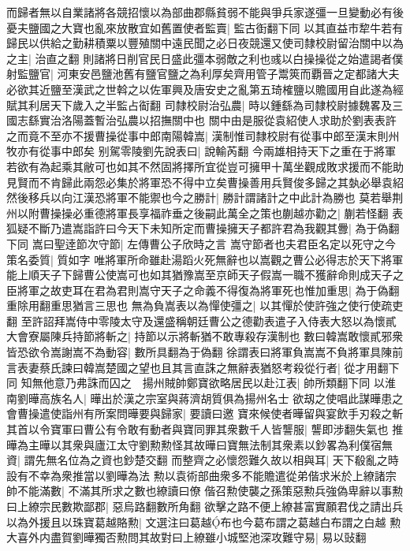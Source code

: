 而歸者無以自業諸將各競招懷以為部曲郡縣貧弱不能與爭兵家遂彊一旦變動必有後憂夫鹽國之大寶也亂來放散宜如舊置使者監賣|{
	監古衘翻下同}
以其直益市犂牛若有歸民以供給之勤耕積粟以豐殖關中遠民聞之必日夜競還又使司隸校尉留治關中以為之主|{
	治直之翻}
則諸將日削官民日盛此彊本弱敵之利也彧以白操操從之始遣謁者僕射監鹽官|{
	河東安邑鹽池舊有鹽官鹽之為利厚矣齊用管子鬻筴而覇晉之定都諸大夫必欲其近鹽至漢武之世斡之以佐軍興及唐安史之亂第五琦榷鹽以贍國用自此遂為經賦其利居天下歲入之半監占䘖翻}
司隸校尉治弘農|{
	時以鍾繇為司隸校尉據魏畧及三國志繇實治洛陽蓋暫治弘農以招撫關中也}
關中由是服從袁紹使人求助於劉表表許之而竟不至亦不援曹操從事中郎南陽韓嵩|{
	漢制惟司隸校尉有從事中郎至漢末則州牧亦有從事中郎矣}
别駕零陵劉先說表曰|{
	說輸芮翻}
今兩雄相持天下之重在于將軍若欲有為起乘其敝可也如其不然固將擇所宜從豈可擁甲十萬坐觀成敗求援而不能助見賢而不肯歸此兩怨必集於將軍恐不得中立矣曹操善用兵賢俊多歸之其埶必舉袁紹然後移兵以向江漢恐將軍不能禦也今之勝計|{
	勝計謂諸計之中此計為勝也}
莫若舉荆州以附曹操操必重德將軍長享福祚垂之後嗣此萬全之策也蒯越亦勸之|{
	蒯若怪翻}
表狐疑不斷乃遣嵩詣許曰今天下未知所定而曹操擁天子都許君為我觀其釁|{
	為于偽翻下同}
嵩曰聖逹節次守節|{
	左傳曹公子欣時之言}
嵩守節者也夫君臣名定以死守之今策名委質|{
	質如字}
唯將軍所命雖赴湯蹈火死無辭也以嵩觀之曹公必得志於天下將軍能上順天子下歸曹公使嵩可也如其猶豫嵩至京師天子假嵩一職不獲辭命則成天子之臣將軍之故吏耳在君為君則嵩守天子之命義不得復為將軍死也惟加重思|{
	為于偽翻重除用翻重思猶言三思也}
無為負嵩表以為憚使彊之|{
	以其憚於使許強之使行使疏吏翻}
至許詔拜嵩侍中零陵太守及還盛稱朝廷曹公之德勸表遣子入侍表大怒以為懷貳大會寮屬陳兵持節將斬之|{
	持節以示將斬猶不敢專殺存漢制也}
數曰韓嵩敢懷貳邪衆皆恐欲令嵩謝嵩不為動容|{
	數所具翻為于偽翻}
徐謂表曰將軍負嵩嵩不負將軍具陳前言表妻蔡氏諫曰韓嵩楚國之望也且其言直誅之無辭表猶怒考殺從行者|{
	從才用翻下同}
知無他意乃弗誅而囚之　揚州賊帥鄭寶欲略居民以赴江表|{
	帥所類翻下同}
以淮南劉曄高族名人|{
	曄出於漢之宗室與蔣濟胡質俱為揚州名士}
欲刼之使唱此謀曄患之會曹操遣使詣州有所案問曄要與歸家|{
	要讀曰邀}
寶來候使者曄留與宴飲手刃殺之斬其首以令寶軍曰曹公有令敢有動者與寶同罪其衆數千人皆讋服|{
	讋即涉翻失氣也}
推曄為主曄以其衆與廬江太守劉勲勲怪其故曄曰寶無法制其衆素以鈔畧為利僕宿無資|{
	謂先無名位為之資也鈔楚交翻}
而整齊之必懷怨難久故以相與耳|{
	天下殽亂之時設有不幸為衆推當以劉曄為法}
勲以袁術部曲衆多不能贍遣從弟偕求米於上繚諸宗帥不能滿數|{
	不滿其所求之數也繚讀曰僚}
偕召勲使襲之孫策惡勲兵強偽卑辭以事勲曰上繚宗民數欺鄙郡|{
	惡烏路翻數所角翻}
欲擊之路不便上繚甚富實願君伐之請出兵以為外援且以珠寶葛越賂勲|{
	文選注曰葛越布也今葛布謂之葛越白布謂之白越}
勲大喜外内盡賀劉曄獨否勲問其故對曰上繚雖小城堅池深攻難守易|{
	易以䜴翻}
